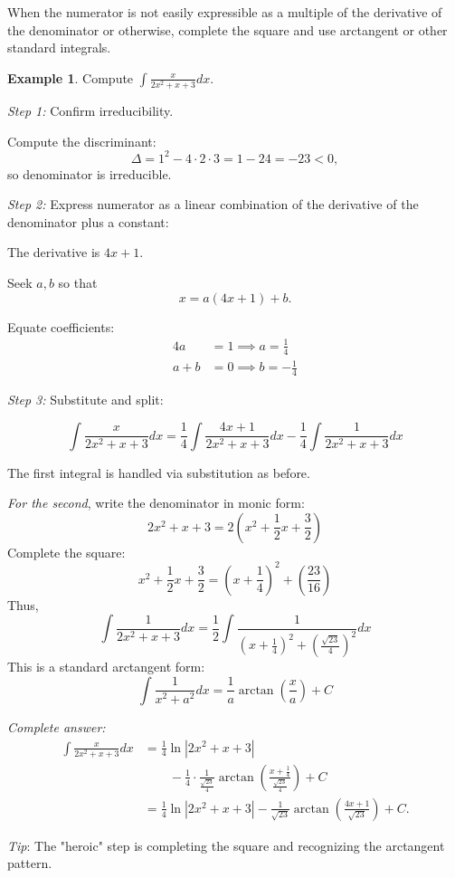 \documentclass[11pt]{article}
\theoremstyle{definition}
\newtheorem{examplex}{Example}[section]
\theoremstyle{plain}
\begin{document}
When the numerator is not easily expressible as a multiple of the derivative of the denominator or otherwise, complete the square and use arctangent or other standard integrals.

\begin{examplex}
    Compute $\displaystyle \int \frac{x}{2x^2 + x + 3} dx$.

    \emph{Step 1:} Confirm irreducibility.

    Compute the discriminant:
    \[
    \Delta = 1^2 - 4\cdot 2 \cdot 3 = 1 - 24 = -23 < 0,
    \]
    so denominator is irreducible.

    \emph{Step 2:} Express numerator as a linear combination of the derivative of the denominator plus a constant:

    The derivative is $4x + 1$.

    Seek $a, b$ so that
    \[
    x = a(4x+1) + b.
    \]
    
    Equate coefficients:
    \begin{align*}
    4a &= 1 \implies a = \frac{1}{4}\\
    a + b &= 0 \implies b = -\frac{1}{4}
    \end{align*}

    \emph{Step 3:} Substitute and split:

    \[
    \int \frac{x}{2x^2 + x + 3} dx
    = \frac{1}{4} \int \frac{4x + 1}{2x^2 + x + 3} dx - \frac{1}{4} \int \frac{1}{2x^2 + x + 3} dx
    \]

    The first integral is handled via substitution as before.

    \emph{For the second}, write the denominator in monic form:
    \[
    2x^2 + x + 3 = 2\left(x^2 + \frac{1}{2}x + \frac{3}{2}\right)
    \]
    Complete the square:
    \[
    x^2 + \frac{1}{2}x + \frac{3}{2} 
    = \left(x + \frac{1}{4}\right)^2 + \left(\frac{23}{16}\right)
    \]
    Thus,
    \[
    \int \frac{1}{2x^2 + x + 3} dx = \frac{1}{2} \int \frac{1}{\left(x + \frac{1}{4}\right)^2 + \left(\frac{\sqrt{23}}{4}\right)^2} dx
    \]
    This is a standard arctangent form:
    \[
    \int \frac{1}{x^2 + a^2} dx = \frac{1}{a} \arctan\left( \frac{x}{a} \right) + C
    \]

    \emph{Complete answer:}
    \begin{align*}
    \int \frac{x}{2x^2 + x + 3} dx 
      &= \frac{1}{4} \ln|2x^2 + x + 3|  \\
      &\qquad - \frac{1}{4} \cdot \frac{1}{\frac{\sqrt{23}}{4}} \arctan\left( \frac{x + \frac{1}{4}}{\frac{\sqrt{23}}{4}} \right) + C\\
    & = \frac{1}{4} \ln|2x^2 + x + 3| - \frac{1}{\sqrt{23}} \arctan\left( \frac{4x + 1}{\sqrt{23}} \right) + C.
    \end{align*}

    \emph{Tip}: The "heroic" step is completing the square and recognizing the arctangent pattern.
\end{examplex}
\end{document}
